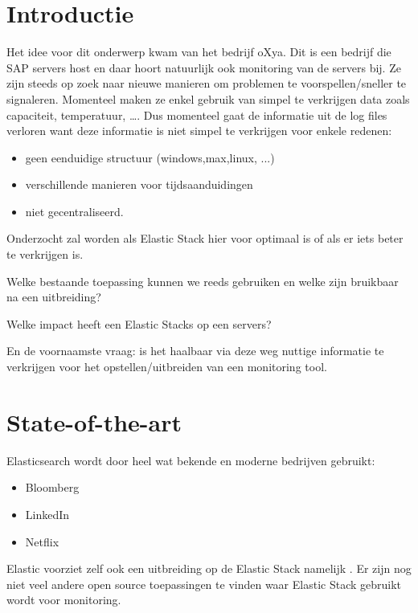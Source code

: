 \documentclass[fleqn,10pt]{voorstel}
\affiliation{\textbf{Contact:}
  \textsuperscript{1} \href{mailto:bert.vervaele@student.hogent.be}{bert.vervaele@student.hogent.be}}
\begin{document}
\flushbottom %
\maketitle %
\tableofcontents %
\thispagestyle{empty} %


\section{Introductie}
\label{sec:introductie}

Het idee voor dit onderwerp kwam van het bedrijf oXya. Dit is een bedrijf die SAP servers host en daar hoort natuurlijk ook monitoring van de servers bij. Ze zijn steeds op zoek naar nieuwe manieren om problemen te voorspellen/sneller te signaleren. Momenteel maken ze enkel gebruik van simpel te verkrijgen data zoals capaciteit, temperatuur, \dots. Dus momenteel gaat de informatie uit de log files verloren want deze informatie is niet simpel te verkrijgen voor enkele redenen:
\begin{itemize}
	\item geen eenduidige structuur (windows,max,linux, ...)
	\item verschillende manieren voor tijdsaanduidingen
	\item niet gecentraliseerd.
\end{itemize}

Onderzocht zal worden als Elastic Stack hier voor optimaal is of als er iets beter te verkrijgen is.

Welke bestaande toepassing kunnen we reeds gebruiken en welke zijn bruikbaar na een uitbreiding?

Welke impact heeft een Elastic Stacks op een servers?

En de voornaamste vraag: is het haalbaar via deze weg nuttige informatie te verkrijgen voor het opstellen/uitbreiden van een monitoring tool.

\section{State-of-the-art}
\label{sec:state-of-the-art}
Elasticsearch wordt door heel wat bekende en moderne bedrijven \autocite{15tech} gebruikt:
\begin{itemize}
	\item Bloomberg
	\item LinkedIn
	\item Netflix
\end{itemize}
Elastic voorziet zelf ook een uitbreiding op de Elastic Stack namelijk  \textcite{X-Pack}.
Er zijn nog niet veel andere open source toepassingen te vinden waar Elastic Stack gebruikt wordt voor monitoring.
\end{document}
